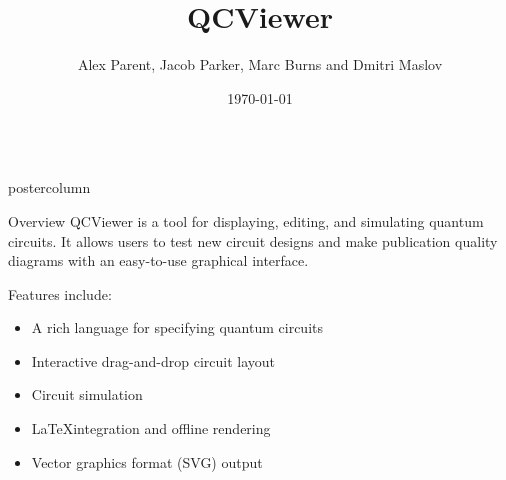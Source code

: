 \documentclass[final]{beamer} %
\title[QCViewer]{QCViewer}
\author[Author]{Alex Parent, Jacob Parker, Marc Burns and Dmitri Maslov}
\institute[IQC, University of Waterloo]{Quantum Circuits group, IQC, University of Waterloo}
\date{\today}
\begin{document}
    \begin{frame}{}
    \begin{columns}
        \begin{column}{.33\textwidth}
        \begin{beamercolorbox}[center,wd=\textwidth]{postercolumn}
        \begin{minipage}[c][0.95\textheight][s]{0.95\columnwidth}
            \begin{block}{\large Overview}
              QCViewer is a tool for displaying, editing, and simulating
              quantum circuits. It allows users to test new circuit designs
              and make publication quality diagrams with an easy-to-use
              graphical interface.

                Features include: %
                \begin{itemize}[]
                    \item A rich language for specifying quantum circuits
                    \item Interactive drag-and-drop circuit layout
                    \item Circuit simulation
                    \item \LaTeX\hspace{0.5em}integration and offline rendering
                    \item Vector graphics format (SVG) output
                \end{itemize}


\end{block}
\end{minipage}
\end{beamercolorbox}
\end{column}
\end{columns}
\end{frame}
\end{document}
